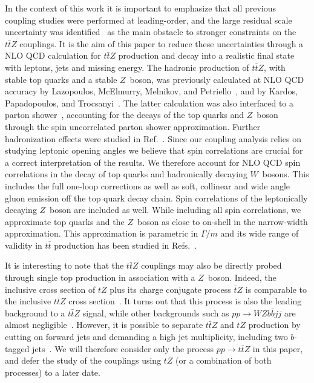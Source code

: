 \documentclass{JHEP3}
\def\ttbZ{t\bar{t}Z}
\def\ttb{t\bar{t}}
\begin{document}
In the context of this work it is important to emphasize that all previous coupling studies were performed at leading-order, and the large residual scale uncertainty 
was identified~\cite{Baur:2004uw} as the main obstacle to stronger constraints on the $\ttbZ$ couplings.
It is the aim of this paper to reduce these uncertainties through a NLO QCD calculation for $\ttbZ$ production and decay into a realistic final state with leptons, jets and missing energy.
The hadronic production of $\ttbZ$, with stable top quarks and a stable $Z$~boson, was previously calculated at NLO QCD accuracy by 
Lazopoulos, McElmurry, Melnikov, and Petriello~\cite{Lazopoulos:2008de}, and  by Kardos, Papadopoulos, and Trocsanyi~\cite{Kardos:2011na}.
The latter calculation was also interfaced to a parton shower~\cite{Garzelli:2011is}, accounting for the decays of the top quarks and $Z$~boson through 
the spin uncorrelated parton shower approximation.
Further hadronization effects were studied in Ref.~\cite{Garzelli:2012bn}.
Since our coupling analysis relies on studying leptonic opening angles we believe that spin correlations are crucial for a correct interpretation of the results.
We therefore account for NLO QCD spin correlations in the decay of top quarks and hadronically decaying $W$~bosons.
This includes the full one-loop corrections as well as soft, collinear and wide angle gluon emission off the top quark decay chain.
Spin correlations of the leptonically decaying $Z$~boson are included as well.
While including all spin correlations, we approximate top quarks and the $Z$~boson as close to on-shell in the narrow-width approximation.
This approximation is parametric in $\Gamma/m$ and its wide range of validity in $\ttb$ production has been studied in Refs.~\cite{Buttar:2008jx,Denner:2012yc,Bevilacqua:2010qb,Heinrich:2013qaa}.

It is interesting to note that the $\ttbZ$ couplings may also be directly probed through single top production in association with a $Z$~boson. 
Indeed, the inclusive cross section of $tZ$ plus its charge conjugate process $\bar{t}Z$ is comparable to the inclusive $\ttbZ$ cross section~\cite{Campbell:2013yla}. 
It turns out that this process is also the leading background to a $\ttbZ$ signal, while other backgrounds such as $pp\to WZ b \bar{b} jj$ are almost negligible~\cite{Baur:2004uw}.
However, it is possible to separate $\ttbZ$ and $tZ$ production by cutting on forward jets and demanding a high jet multiplicity, including two $b$-tagged jets~\cite{Campbell:2013yla}. 
We will therefore consider only the process $pp \to \ttbZ$ in this paper, and defer the study of the couplings using $tZ$ (or a combination of both processes) to a later date. 
\end{document}
